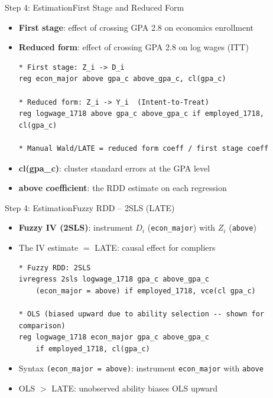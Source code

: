 \documentclass[dvipsnames,hyperref={pdfpagelabels=false}]{beamer}
\begin{document}

\begin{frame}[fragile]{Step 4: Estimation}{First Stage and Reduced Form}
	\begin{itemize}
		\item \textbf{First stage}: effect of crossing GPA 2.8 on economics enrollment
		\item \textbf{Reduced form}: effect of crossing GPA 2.8 on log wages (ITT)
\begin{lstlisting}
* First stage: Z_i -> D_i
reg econ_major above gpa_c above_gpa_c, cl(gpa_c)

* Reduced form: Z_i -> Y_i  (Intent-to-Treat)
reg logwage_1718 above gpa_c above_gpa_c if employed_1718, cl(gpa_c)

* Manual Wald/LATE = reduced form coeff / first stage coeff
\end{lstlisting}
		\vspace{0.2cm}
		\item \textbf{cl(gpa\_c)}: cluster standard errors at the GPA level
		\vspace{0.2cm}
		\item \textbf{above coefficient}: the RDD estimate on each regression
	\end{itemize}
\end{frame}


\begin{frame}[fragile]{Step 4: Estimation}{Fuzzy RDD -- 2SLS (LATE)}
	\begin{itemize}
		\item \textbf{Fuzzy IV (2SLS)}: instrument $D_i$ (\texttt{econ\_major}) with $Z_i$ (\texttt{above})
		\item The IV estimate $= $ LATE: causal effect for compliers
\begin{lstlisting}
* Fuzzy RDD: 2SLS
ivregress 2sls logwage_1718 gpa_c above_gpa_c
    (econ_major = above) if employed_1718, vce(cl gpa_c)

* OLS (biased upward due to ability selection -- shown for comparison)
reg logwage_1718 econ_major gpa_c above_gpa_c
    if employed_1718, cl(gpa_c)
\end{lstlisting}
		\vspace{0.2cm}
		\item Syntax \texttt{(econ\_major = above)}: instrument \texttt{econ\_major} with \texttt{above}
		\vspace{0.2cm}
		\item OLS $> $ LATE: unobserved ability biases OLS upward
	\end{itemize}
\end{frame}
\end{document}
